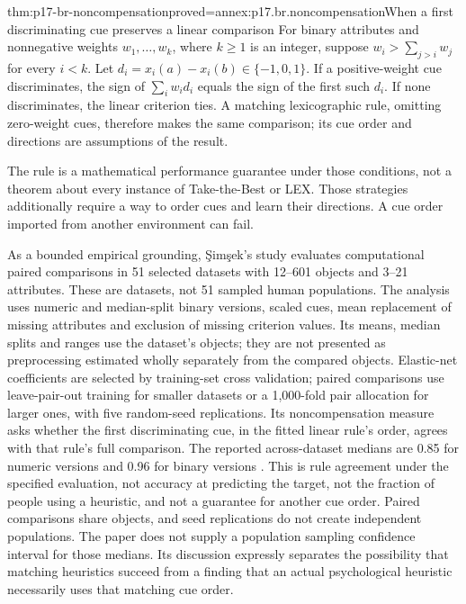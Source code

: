 \begin{hblemma}{thm:p17-br-noncompensation}{proved=annex:p17.br.noncompensation}{When a first discriminating cue preserves a linear comparison}
For binary attributes and nonnegative weights \(w_1,\ldots,w_k\),
where \(k\geq1\) is an integer, suppose
\(w_i>\sum_{j>i}w_j\) for every \(i<k\).
Let \(d_i=x_i(a)-x_i(b)\in\{-1,0,1\}\).
If a positive-weight cue discriminates, the sign of \(\sum_iw_id_i\)
equals the sign of the first such \(d_i\). If none discriminates,
the linear criterion ties. A matching lexicographic rule, omitting
zero-weight cues, therefore makes the same
comparison; its cue order and directions are assumptions of the result.
\end{hblemma}

The rule is a mathematical performance guarantee under those conditions,
not a theorem about every instance of Take-the-Best or LEX. Those
strategies additionally require a way to order cues and learn their
directions. A cue order imported from another environment can fail.

As a bounded empirical grounding, Şimşek's study evaluates computational
paired comparisons in 51 selected datasets with 12--601 objects and
3--21 attributes. These are datasets, not 51 sampled human populations.
The analysis uses numeric and median-split binary versions, scaled cues,
mean replacement of missing attributes and exclusion of missing criterion
values. Its means, median splits and ranges use the dataset's objects;
they are not presented as preprocessing estimated wholly separately from
the compared objects. Elastic-net coefficients are selected by training-set cross
validation; paired comparisons use leave-pair-out training for smaller
datasets or a 1,000-fold pair allocation for larger ones, with five
random-seed replications. Its noncompensation measure asks whether the
first discriminating cue, in the fitted linear rule's order, agrees with
that rule's full comparison. The reported across-dataset medians are
0.85 for numeric versions and 0.96 for binary versions
\cite[§4, pp.~4--7]{Simsek2013LinearDecision}.
This is rule agreement under the specified evaluation, not accuracy at
predicting the target, not the fraction of people using a heuristic, and
not a guarantee for another cue order. Paired comparisons share objects,
and seed replications do not create independent populations. The paper
does not supply a population sampling confidence interval for those
medians. Its discussion expressly separates the possibility that matching
heuristics succeed from a finding that an actual psychological heuristic
necessarily uses that matching cue order.

